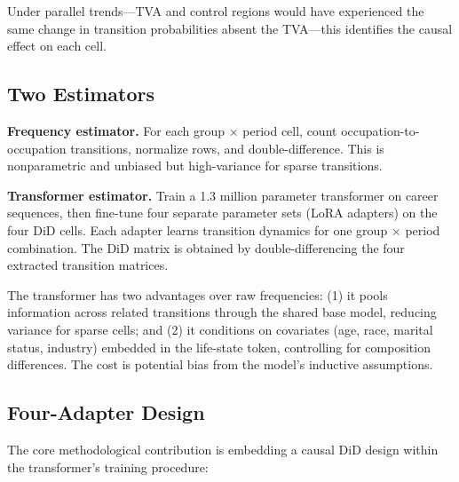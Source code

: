 \documentclass[12pt]{article}
\begin{document}
Under parallel trends---TVA and control regions would have experienced the same change in transition probabilities absent the TVA---this identifies the causal effect on each cell.

\subsection{Two Estimators}

\textbf{Frequency estimator.} For each group $\times$ period cell, count occupation-to-occupation transitions, normalize rows, and double-difference. This is nonparametric and unbiased but high-variance for sparse transitions.

\textbf{Transformer estimator.} Train a 1.3 million parameter transformer on career sequences, then fine-tune four separate parameter sets (LoRA adapters) on the four DiD cells. Each adapter learns transition dynamics for one group $\times$ period combination. The DiD matrix is obtained by double-differencing the four extracted transition matrices.

The transformer has two advantages over raw frequencies: (1) it pools information across related transitions through the shared base model, reducing variance for sparse cells; and (2) it conditions on covariates (age, race, marital status, industry) embedded in the life-state token, controlling for composition differences. The cost is potential bias from the model's inductive assumptions.

\subsection{Four-Adapter Design}

The core methodological contribution is embedding a causal DiD design within the transformer's training procedure:
\end{document}
